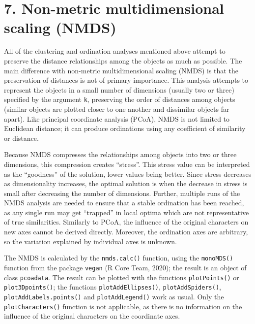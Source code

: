 \documentclass[
  11pt,
  a4paper]{article}
\begin{document}
\newpage

\hypertarget{non-metric-multidimensional-scaling-nmds}{%
\section{7. Non-metric multidimensional scaling
(NMDS)}\label{non-metric-multidimensional-scaling-nmds}}

All of the clustering and ordination analyses mentioned above attempt to
preserve the distance relationships among the objects as much as
possible. The main difference with non-metric multidimensional scaling
(NMDS) is that the preservation of distances is not of primary
importance. This analysis attempts to represent the objects in a small
number of dimensions (usually two or three) specified by the argument
\texttt{k}, preserving the order of distances among objects (similar
objects are plotted closer to one another and dissimilar objects far
apart). Like principal coordinate analysis (PCoA), NMDS is not limited
to Euclidean distance; it can produce ordinations using any coefficient
of similarity or distance. \vspace{-0.1cm}

Because NMDS compresses the relationships among objects into two or
three dimensions, this compression creates ``stress''. This stress value
can be interpreted as the ``goodness'' of the solution, lower values
being better. Since stress decreases as dimensionality increases, the
optimal solution is when the decrease in stress is small after
decreasing the number of dimensions. Further, multiple runs of the NMDS
analysis are needed to ensure that a stable ordination has been reached,
as any single run may get ``trapped'' in local optima which are not
representative of true similarities. Similarly to PCoA, the influence of
the original characters on new axes cannot be derived directly.
Moreover, the ordination axes are arbitrary, so the variation explained
by individual axes is unknown. \vspace{-0.1cm}

The NMDS is calculated by the \texttt{nmds.calc()} function, using the
\texttt{monoMDS()} function from the package \texttt{vegan} (R Core
Team, 2020); the result is an object of class \texttt{pcoadata}. The
result can be plotted with the functions \texttt{plotPoints()} or
\texttt{plot3Dpoints()}; the functions \texttt{plotAddEllipses()},
\texttt{plotAddSpiders()}, \texttt{plotAddLabels.points()} and
\texttt{plotAddLegend()} work as usual. Only the
\texttt{plotCharacters()} function is not applicable, as there is no
information on the influence of the original characters on the
coordinate axes. \vspace{-0.1cm}
\end{document}
